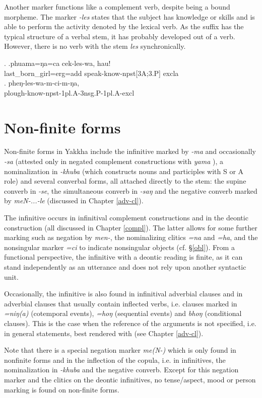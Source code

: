 Another marker functions like a complement verb, despite being  a bound morpheme. The marker \emph{-les} states that the subject has knowledge or skills and is able to perform the activity denoted by the lexical verb. As the suffix has the typical structure of a verbal stem, it has probably developed out of a verb. However, there is no verb with the stem \emph{les} synchronically.

\ex. \ag.phuama=ŋa=ca        cek-les-wa,                hau!\\
last\_born\_girl{\sc =erg=add} speak-know{\sc -npst[3A;3.P]} {\sc excla}\\
 
\bg.        pheŋ-les-wa-m-ci-m-ŋa,\\
plough-know{\sc -npst-1pl.A-3nsg.P-1pl.A-excl}\\
 

\section{Non-finite forms}\label{nonfiniteforms}

Non-finite forms in Yakkha include the infinitive marked by \emph{-ma} and occasionally \emph{-sa} (attested only in negated complement constructions with \emph{yama} ), a nominalization in \emph{-khuba} (which constructs nouns and participles with S or A role) and several converbal forms, all attached directly to the stem: the supine converb in \emph{-se}, the simultaneous converb in \emph{-saŋ} and the negative converb marked by \emph{meN-...-le} (discussed in Chapter \ref{adv-cl}).

The infinitive occurs in infinitival complement constructions and in the deontic construction (all discussed in Chapter \ref{compl}). The latter allows for some further marking such as negation by \emph{men-}, the nominalizing clitics \emph{=na} and \emph{=ha}, and the nonsingular marker \emph{=ci} to indicate nonsingular objects (cf. §\ref{obl}). From a functional perspective, the infinitive with a deontic reading is finite, as it can stand independently as an utterance and does not rely upon another syntactic unit. 

Occasionally, the infinitive is also found in infinitival adverbial clauses and in adverbial clauses that usually contain inflected verbs, i.e. clauses marked in \emph{=niŋ(a)} (cotemporal events), \emph{=hoŋ} (sequential events) and \emph{bhoŋ} (conditional clauses). This is the case when the reference of the arguments is not specified, i.e. in general statements, best rendered with  (see Chapter \ref{adv-cl}). 

Note that there is a special negation marker \emph{me(N-)} which is only found in nonfinite forms and in the inflection of the copula, i.e. in  infinitives, the nominalization in \emph{-khuba} and  the negative converb. Except for this negation marker and the clitics on the deontic infinitives, no tense/aspect, mood or person marking is found on non-finite forms.
